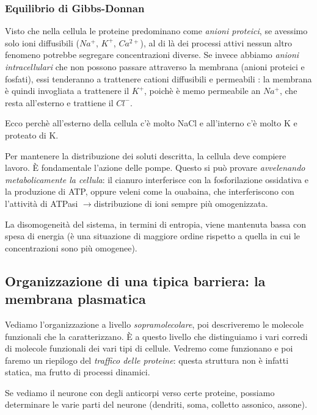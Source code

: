 \documentclass[a4paper,12pt]{article}
\newcommand{\lfreccia}{\ensuremath{\longrightarrow}}
\begin{document}
\subsubsection{Equilibrio di  Gibbs-Donnan}
Visto che nella cellula le proteine predominano come \emph{anioni proteici}, se avessimo solo ioni diffusibili ($Na^{+}$, $K^{+}$, $Ca^{2+}$), al di là dei processi attivi nessun altro fenomeno potrebbe segregare concentrazioni diverse. Se invece abbiamo \emph{anioni intracellulari} che non possono passare attraverso la membrana (anioni proteici e fosfati), essi tenderanno a trattenere cationi diffusibili e permeabili : la membrana è quindi invogliata a trattenere il $K^{+}$, poichè è memo permeabile an $Na^{+}$, che resta all'esterno e trattiene il $Cl^{-}$.

Ecco perchè all'esterno della cellula c'è molto NaCl e all'interno c'è molto K e proteato di K.

Per mantenere la distribuzione dei soluti descritta, la cellula deve compiere lavoro. È fondamentale l'azione delle pompe. Questo si può provare \emph{avvelenando metabolicamente la cellula}: il cianuro interferisce con la fosforilazione ossidativa e la produzione di ATP, oppure veleni come la ouabaina, che interferiscono con l'attività di ATPasi \lfreccia  distribuzione di ioni sempre più omogenizzata.

La disomogeneità del sistema, in termini di entropia, viene mantenuta bassa con spesa di energia (è una situazione di maggiore ordine rispetto a quella in cui le concentrazioni sono più omogenee).


\subsection{Organizzazione di una tipica barriera: la membrana plasmatica}
Vediamo l'organizzazione a livello \emph{sopramolecolare}, poi descriveremo le molecole funzionali che la caratterizzano. È a questo livello che distinguiamo i vari corredi di molecole funzionali dei vari tipi di cellule. Vedremo come funzionano e poi faremo un riepilogo del \emph{traffico delle proteine}: questa struttura non è infatti statica, ma frutto di processi dinamici.

Se vediamo il neurone con degli anticorpi verso certe proteine, possiamo determinare le varie parti del neurone (dendriti, soma, colletto assonico, assone).
\end{document}
